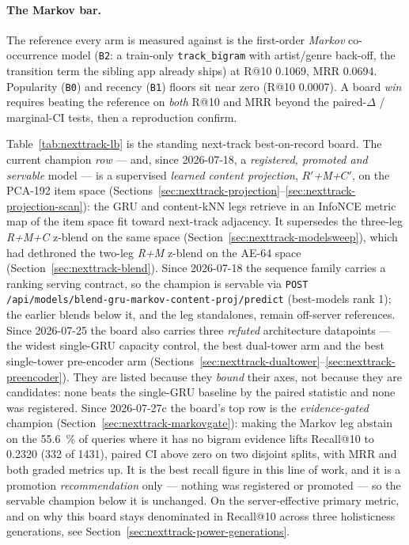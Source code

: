 \documentclass[11pt]{article}
\newcommand{\Rp}{\ensuremath{R'}}
\newcommand{\Cp}{\ensuremath{C'}}
\begin{document}
\paragraph{The Markov bar.} The reference every arm is measured against is the
first-order \emph{Markov} co-occurrence model (\texttt{B2}: a train-only
\texttt{track\_bigram} with artist/genre back-off, the transition term the
sibling app already ships) at R@10 \num{0.1069}, MRR \num{0.0694}. Popularity
(\texttt{B0}) and recency (\texttt{B1}) floors sit near zero (R@10
\num{0.0007}). A board \emph{win} requires beating the reference on
\emph{both} R@10 and MRR beyond the paired-$\Delta$ / marginal-CI tests, then a
reproduction confirm.

Table~\ref{tab:nexttrack-lb} is the standing next-track best-on-record board.
The current champion \emph{row} --- and, since 2026-07-18, a \emph{registered,
promoted and servable} model --- is a supervised \emph{learned content
projection}, \emph{\Rp+M+\Cp}, on the PCA-192 item space
(Sections~\ref{sec:nexttrack-projection}--\ref{sec:nexttrack-projection-scan}):
the GRU and content-kNN legs retrieve in an InfoNCE metric map of the item space
fit toward next-track adjacency. It supersedes the three-leg \emph{R+M+C} z-blend
on the same space (Section~\ref{sec:nexttrack-modelsweep}), which had dethroned
the two-leg \emph{R+M} z-blend on the AE-64 space
(Section~\ref{sec:nexttrack-blend}). Since 2026-07-18 the sequence family carries
a ranking serving contract, so the champion is servable via
\texttt{POST /api/models/blend-gru-markov-content-proj/predict} (best-models rank
1); the earlier blends below it, and the leg standalones, remain off-server
references. Since 2026-07-25 the board also carries three \emph{refuted}
architecture datapoints --- the widest single-GRU capacity control, the best
dual-tower arm and the best single-tower pre-encoder arm
(Sections~\ref{sec:nexttrack-dualtower}--\ref{sec:nexttrack-preencoder}). They
are listed because they \emph{bound} their axes, not because they are
candidates: none beats the single-GRU baseline by the paired statistic and none
was registered. Since 2026-07-27c the board's top row is the \emph{evidence-gated}
champion (Section~\ref{sec:nexttrack-markovgate}): making the Markov leg abstain on
the \SI{55.6}{\percent} of queries where it has no bigram evidence lifts Recall@10
to \num{0.2320} (\num{332} of \num{1431}), paired CI above zero on two disjoint
splits, with MRR and both graded metrics up. It is the best recall figure in this
line of work, and it is a promotion \emph{recommendation} only --- nothing was
registered or promoted --- so the servable champion below it is unchanged.
On the server-effective primary metric, and on why this board
stays denominated in Recall@10 across three holisticness generations, see
Section~\ref{sec:nexttrack-power-generations}.
\end{document}
